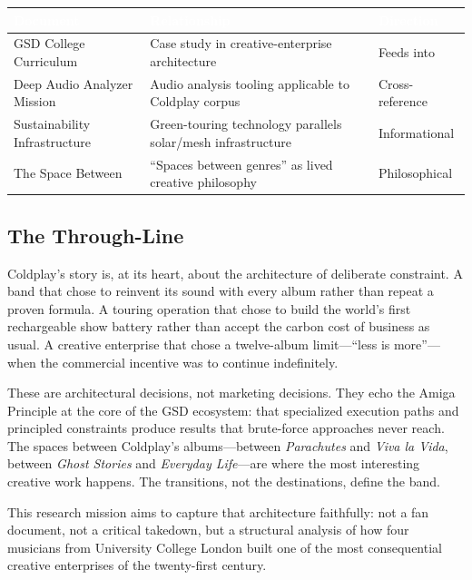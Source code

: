 \documentclass[11pt,letterpaper]{article}
\newcommand{\tableheader}[1]{\textbf{\sffamily\textcolor{white}{#1}}}
\begin{document}
\begin{center}
\begin{tabularx}{\textwidth}{L{4cm}XC{2cm}}
\toprule
{}
\tableheader{Document} & \tableheader{Relationship} & \tableheader{Direction} \\
\midrule
GSD College Curriculum & Case study in creative-enterprise architecture & Feeds into \\
Deep Audio Analyzer Mission & Audio analysis tooling applicable to Coldplay corpus & Cross-reference \\
Sustainability Infrastructure & Green-touring technology parallels solar/mesh infrastructure & Informational \\
The Space Between & ``Spaces between genres'' as lived creative philosophy & Philosophical \\
\bottomrule
\end{tabularx}
\end{center}

\subsection{The Through-Line}

Coldplay's story is, at its heart, about the architecture of deliberate constraint. A band that chose to reinvent its sound with every album rather than repeat a proven formula. A touring operation that chose to build the world's first rechargeable show battery rather than accept the carbon cost of business as usual. A creative enterprise that chose a twelve-album limit---``less is more''---when the commercial incentive was to continue indefinitely.

These are architectural decisions, not marketing decisions. They echo the Amiga Principle at the core of the GSD ecosystem: that specialized execution paths and principled constraints produce results that brute-force approaches never reach. The spaces between Coldplay's albums---between \textit{Parachutes} and \textit{Viva la Vida}, between \textit{Ghost Stories} and \textit{Everyday Life}---are where the most interesting creative work happens. The transitions, not the destinations, define the band.

This research mission aims to capture that architecture faithfully: not a fan document, not a critical takedown, but a structural analysis of how four musicians from University College London built one of the most consequential creative enterprises of the twenty-first century.
\end{document}
